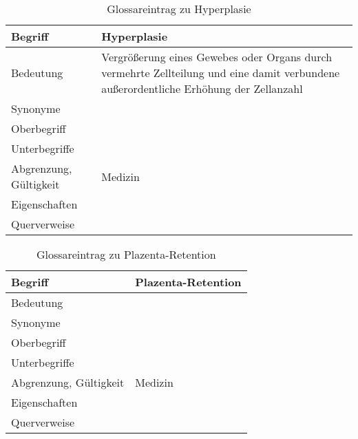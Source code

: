 \begin{table}[h]
	\centering	
	\begin{tabular}{ p{4.5cm} p{10.5cm} } 
		\toprule[1pt]
		\rowcolor{maroon!30}
		\textbf{Begriff} &  \textbf{Hyperplasie}\\		
		\midrule
	
		Bedeutung  & Vergrößerung eines Gewebes oder Organs durch vermehrte Zellteilung und eine damit verbundene außerordentliche Erhöhung der Zellanzahl\\		
		Synonyme  & \\				
		Oberbegriff  &  \\		
		Unterbegriffe   & \\		
		Abgrenzung, Gültigkeit  & Medizin\\				
		Eigenschaften  & \\			
		Querverweise  & \\
		\bottomrule					
		
	\end{tabular}
	\label{tab: Glossareintrag zu Hyperplasie}
	\caption{Glossareintrag zu Hyperplasie}
\end{table}



\begin{table}[h]
	\centering	
	\begin{tabular}{ p{4.5cm} p{10.5cm} } 
		\toprule[1pt]
		\rowcolor{maroon!30}
		\textbf{Begriff} &  \textbf{Plazenta-Retention}\\
		\midrule
		Bedeutung  &\\		
		Synonyme  & \\				
		Oberbegriff  &  \\		
		Unterbegriffe   &\\		
		Abgrenzung, Gültigkeit  & Medizin\\				
		Eigenschaften  & \\			
		Querverweise  & \\	
		\bottomrule				
		
	\end{tabular}
	\label{tab: Glossareintrag zu Plazenta-Retention}
	\caption{Glossareintrag zu Plazenta-Retention}
\end{table}


